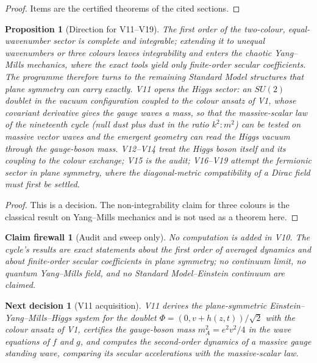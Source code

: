 \documentclass[11pt]{article}
\newtheorem{proposition}[theorem]{Proposition}
\newtheorem{firewall}[theorem]{Claim firewall}
\newtheorem{decision}[theorem]{Next decision}
\theoremstyle{remark}
\begin{document}
\begin{proof}
Items are the certified theorems of the cited sections.
\end{proof}

\begin{proposition}[Direction for V11--V19]
\label{prop:v20v10-direction}
The first order of the two-colour, equal-wavenumber sector is
complete and integrable; extending it to unequal wavenumbers or three
colours leaves integrability and enters the chaotic Yang--Mills
mechanics, where the exact tools yield only finite-order secular
coefficients.  The programme therefore turns to the remaining
Standard Model structures that plane symmetry can carry exactly.  V11
opens the Higgs sector: an \(SU(2)\) doublet in the vacuum
configuration coupled to the colour ansatz of V1, whose covariant
derivative gives the gauge waves a mass, so that the massive-scalar
law of the nineteenth cycle (null dust plus dust in the ratio
\(k^2:m^2\)) can be tested on massive vector waves and the emergent
geometry can read the Higgs vacuum through the gauge-boson mass.
V12--V14 treat the Higgs boson itself and its coupling to the colour
exchange; V15 is the audit; V16--V19 attempt the fermionic sector in
plane symmetry, where the diagonal-metric compatibility of a Dirac
field must first be settled.
\end{proposition}

\begin{proof}
This is a decision.  The non-integrability claim for three colours is
the classical result on Yang--Mills mechanics and is not used as a
theorem here.
\end{proof}

\begin{firewall}[Audit and sweep only]
\label{fire:v20v10}
No computation is added in V10.  The cycle's results are exact
statements about the first order of averaged dynamics and about
finite-order secular coefficients in plane symmetry; no continuum
limit, no quantum Yang--Mills field, and no Standard Model--Einstein
continuum are claimed.
\end{firewall}

\begin{decision}[V11 acquisition]
\label{dec:v20v10-next}
V11 derives the plane-symmetric Einstein--Yang--Mills--Higgs system
for the doublet \(\Phi=(0,v+h(z,t))/\sqrt2\) with the colour ansatz of
V1, certifies the gauge-boson mass \(m_A^2=e^2v^2/4\) in the wave
equations of \(f\) and \(g\), and computes the second-order dynamics of
a massive gauge standing wave, comparing its secular accelerations with
the massive-scalar law.
\end{decision}
\end{document}
